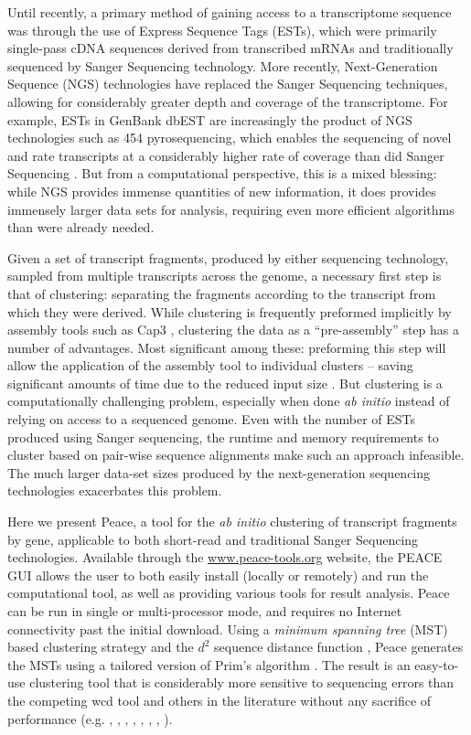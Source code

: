 \documentclass[a4,center,fleqn]{NAR}
\begin{document}
Until recently, a primary method of gaining access to a transcriptome
sequence was through the use of Express Sequence Tags (ESTs), which
were primarily single-pass cDNA sequences derived from transcribed
mRNAs and traditionally sequenced by Sanger Sequencing technology.
More recently, Next-Generation Sequence (NGS) technologies have
replaced the Sanger Sequencing techniques, allowing for considerably
greater depth and coverage of the transcriptome.  For example, ESTs in
GenBank dbEST are increasingly the product of NGS technologies such as
454 pyrosequencing, which enables the sequencing of novel and rate
transcripts at a considerably higher rate of coverage than did Sanger
Sequencing \cite{Cheung2006,Emrich2007}.  But from a computational
perspective, this is a mixed blessing: while NGS provides immense
quantities of new information, it does provides immensely larger data sets
for analysis, requiring even more efficient algorithms than were
already needed.

Given a set of transcript fragments, produced by either sequencing
technology, sampled from multiple transcripts across the genome, a
necessary first step is that of clustering: separating the fragments
according to the transcript from which they were derived.  While
clustering is frequently preformed implicitly by assembly tools such
as {\sc Cap3} \cite{Huang99}, clustering the data as a
``pre-assembly'' step has a number of advantages.  Most significant
among these: preforming this step will allow the application of the
assembly tool to individual clusters -- saving significant amounts of
time due to the reduced input size \cite{Hazelhurst08a}.  But
clustering is a computationally challenging problem, especially when
done {\it ab initio} instead of relying on access to a sequenced
genome.  Even with the number of ESTs produced using Sanger
sequencing, the runtime and memory requirements to cluster based on
pair-wise sequence alignments make such an approach infeasible.  The
much larger data-set sizes produced by the next-generation sequencing
technologies exacerbates this problem.

Here we present {\sc Peace}, a tool for the {\it ab initio} clustering
of transcript fragments by gene, applicable to both short-read and traditional
Sanger Sequencing technologies.  Available through the
\href{http://www.peace-tools.org}{www.peace-tools.org} website, the PEACE GUI allows the user
to both easily install (locally or remotely) and run the computational
tool, as well as providing various tools for result analysis. {\sc
  Peace} can be run in single or multi-processor mode, and requires no
Internet connectivity past the initial download.  Using a {\it minimum
  spanning tree} (MST) based clustering strategy \cite{Jain99,Wan08}
and the $d^2$ sequence distance function \cite{Hide94}, {\sc Peace}
generates the MSTs using a tailored version of Prim's algorithm
\cite{Prim57}.  The result is an easy-to-use clustering tool that is considerably
more sensitive to sequencing errors than the competing {\sc wcd} tool
\cite{Hazelhurst08a} and others in the literature without any
sacrifice of performance (e.g. \cite{Burke99}, \cite{Slater00},
\cite{Huang99}, \cite{Parkinson02}, \cite{Kalyanaraman03},
\cite{Malde03}, \cite{Ptitsyn05}, \cite{Picardi09}).
\end{document}
